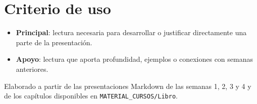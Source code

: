 \documentclass[10pt,a4paper]{article}
\newcommand{\principal}{\textbf{Principal}}
\newcommand{\apoyo}{\textbf{Apoyo}}
\begin{document}
\section*{Criterio de uso}

\begin{itemize}
  \item \principal: lectura necesaria para desarrollar o justificar directamente una parte de la presentación.
  \item \apoyo: lectura que aporta profundidad, ejemplos o conexiones con semanas anteriores.
\end{itemize}

\vfill
\begin{center}
  \small\color{UAPGray}
  Elaborado a partir de las presentaciones Markdown de las semanas 1, 2, 3 y 4 y de los capítulos disponibles en \texttt{MATERIAL\_CURSOS/Libro}.
\end{center}
\end{document}
